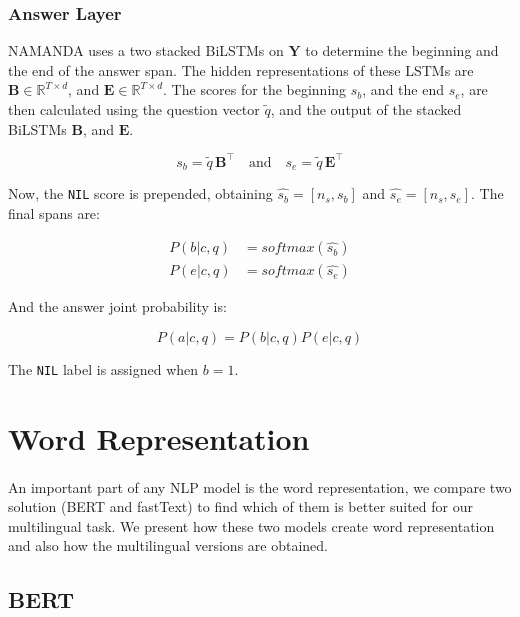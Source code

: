 \subsubsection{Answer Layer}
NAMANDA uses a two stacked BiLSTMs on $\mathbf{Y}$ to determine the beginning and the end of the answer span. The hidden representations of these LSTMs are $\mathbf{B} \in \mathbb{R}^{T \times d}$, and $\mathbf{E} \in \mathbb{R}^{T \times d}$. The scores for the beginning $s_b$, and the end $s_e$, are then calculated using the question vector $\tilde{q}$, and the output of the stacked BiLSTMs $\mathbf{B}$, and $\mathbf{E}$.

\begin{equation}
s_b = \tilde{q} \, \mathbf{B}^{\intercal}
   \quad\mathrm{and}\quad 
s_e = \tilde{q}\, \mathbf{E}^{\intercal}
\end{equation}

Now, the \texttt{NIL} score is prepended, obtaining $\hat{s_b} = [n_s, s_b]$ and $\hat{s_e} = [n_s, s_e]$. The final spans are:

\begin{equation}
\begin{split}
    P(b | c, q) & = softmax(\hat{s_b}) \\
    P(e | c, q) & = softmax(\hat{s_e})
\end{split}
\end{equation}

And the answer joint probability is:

\begin{equation}
    P(a|c, q) = P(b | c, q)P(e | c, q)
\end{equation}

The \texttt{NIL} label is assigned when $b=1$.


\section{Word Representation}
\label{sec:w_e}
\paragraph{}
An important part of any NLP model is the word representation, we compare two solution (BERT and fastText) to find which of them is better suited for our multilingual task. We present how these two models create word representation and also how the multilingual versions are obtained. 

\subsection{BERT}

